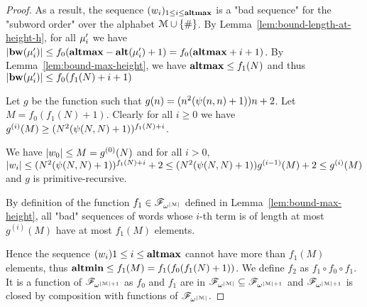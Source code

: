 \begin{proof}
	As a result, the sequence $(w_i)_{1\leq i \leq \mathbf{altmax}}$ is a "bad sequence" for the "subword order" over the alphabet $\mathcal{M}\cup\{\#\}$.
	By Lemma~\ref{lem:bound-length-at-height-h}, for all $\mu'_i$ we have $|\mathbf{bw}(\mu'_i)| \leq f_0(\mathbf{altmax} - \mathbf{alt}(\mu'_i)+1) = f_0(\mathbf{altmax} +i+1)$.
	By Lemma~\ref{lem:bound-max-height}, we have $\mathbf{altmax} \leq f_1(N)$ and thus $|\mathbf{bw}(\mu'_i)| \leq  f_0(f_1(N) +i+1)$
	
	Let $g$ be the function such that $g(n) = (n^2(\psi(n,n)+1))n+2$. 
	Let $M = f_0(f_1(N)+1)$. Clearly for all $i\geq 0$ we have $g^{(i)}(M) \geq (N^2(\psi(N,N)+1))^{f_1(N) + i}$.
	
	We have $|w_0| \leq M = g^{(0)}(N)$ and for all $i>0$, $|w_i| \leq (N^2(\psi(N,N)+1))^{f_1(N) + i} + 2 \leq (N^2(\psi(N,N)+1)) g^{(i-1)}(M) + 2 \leq g^{(i)}(M)$ and $g$ is primitive-recursive.
	
	By definition of the function $f_1 \in \mathscr{F}_{\omega^{|\mathcal{M}|}}$ defined in Lemma~\ref{lem:bound-max-height}, all "bad" sequences of words whose $i$-th term is of length at most $g^{(i)}(M)$ have at most $f_1(M)$ elements.
	
	Hence the sequence $(w_i){1\leq i \leq \mathbf{altmax}}$ cannot have more than $f_1(M)$ elements, thus $\mathbf{altmin} \leq f_1(M) = f_1(f_0(f_1(N)+1))$.
	We define $f_2$ as $f_1 \circ f_0 \circ f_1$. It is a function of $\mathscr{F}_{\omega^{|\mathcal{M}|+1}}$ as $f_0$ and $f_1$ are in $\mathscr{F}_{\omega^{|\mathcal{M}|}} \subseteq \mathscr{F}_{\omega^{|\mathcal{M}|+1}}$ and $\mathscr{F}_{\omega^{|\mathcal{M}|+1}}$ is closed by composition with functions of $\mathscr{F}_{\omega^{|\mathcal{M}|}}$.
\end{proof}

\PropBoundTreeSize*


